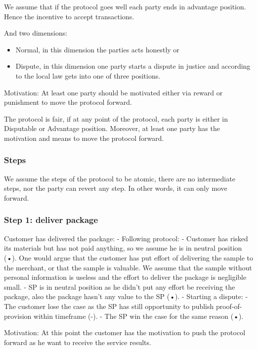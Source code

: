 \documentclass{article}
\begin{document}
We assume that if the protocol goes well each party ends in advantage position. Hence the incentive to accept transactions.

And two dimensions:
\begin{itemize}
    \item Normal, in this dimension the parties acts honestly or 
    \item Dispute, in this dimension one party starts a dispute in justice and according to the local law gets into one of three positions.
\end{itemize}


Motivation:
At least one party should be motivated either via reward or punishment to move the protocol forward.

The protocol is fair, if at any point of the protocol, each party is either in Disputable or Advantage position. Moreover, at least one party has the motivation and means to move the protocol forward. 

\subsubsection{Steps}
We assume the steps of the protocol to be atomic, there are no intermediate steps, nor the party can revert any step. In other words, it can only move forward.

\subsubsection{Step 1: deliver package}
    Customer has delivered the package:
- Following protocol:
	- Customer has risked its materials but has not paid anything, so we assume he is in neutral position (•). One would argue that the customer has put effort of delivering the sample to the merchant, or that the sample is valuable. We assume that the sample without personal information is useless and the effort to deliver the package is negligible small.
	- SP is in neutral position as he didn't put any effort be receiving the package, also the package hasn't any value to the SP (•).
- Starting a dispute:
	- The customer lose the case as the SP has still opportunity to publish proof-of-provision within timeframe (-).
	- The SP win the case for the same reason (•).

Motivation:
At this point the customer has the motivation to push the protocol forward as he want to receive the service results.
\end{document}
